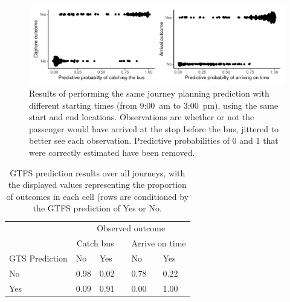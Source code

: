 \begin{knitrout}\small
{}\color{fgcolor}\begin{figure}

{\centering \includegraphics[width=\textwidth]{figure/eta_journey_results_avg-1} 

}

\caption[Results of performing the same journey planning prediction with different starting times (from  9:00~am to  3:00~pm), using the same start and end locations]{Results of performing the same journey planning prediction with different starting times (from  9:00~am to  3:00~pm), using the same start and end locations. Observations are whether or not the passenger would have arrived at the stop before the bus, jittered to better see each observation. Predictive probabilities of 0 and 1 that were correctly estimated have been removed.}\label{fig:eta_journey_results_avg}
\end{figure}

\begin{table}

\caption{\label{tab:eta_journey_results_avg}GTFS prediction results over all journeys, with the displayed values representing the proportion of outcomes in each cell (rows are conditioned by the GTFS prediction of Yes or No. }
\centering
\fontsize{8}{10}\selectfont
\begin{tabular}[t]{llllll}
\toprule
\multicolumn{1}{c}{} & \multicolumn{5}{c}{Observed outcome} \\
\cmidrule(l{3pt}r{3pt}){2-6}
\multicolumn{1}{c}{ } & \multicolumn{2}{c}{Catch bus} & \multicolumn{1}{c}{} & \multicolumn{2}{c}{Arrive on time} \\
\cmidrule(l{3pt}r{3pt}){2-3} \cmidrule(l{3pt}r{3pt}){5-6}
GTS Prediction & No & Yes &  & No & Yes\\
\midrule
No & 0.98 & 0.02 &  & 0.78 & 0.22\\
Yes & 0.09 & 0.91 &  & 0.00 & 1.00\\
\bottomrule
\end{tabular}
\end{table}


\end{knitrout}

